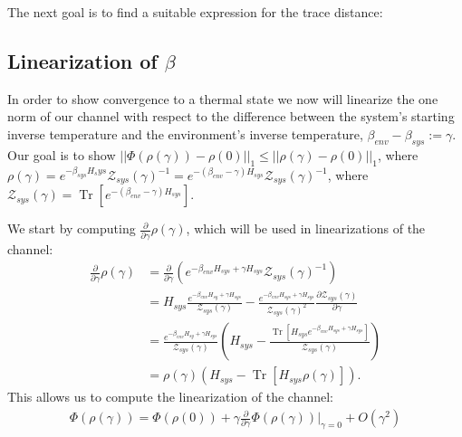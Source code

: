 \documentclass{article}
\newcommand{\parens}[1]{\left( #1 \right)}
\newcommand{\brackets}[1]{\left[ #1 \right]}
\newcommand{\norm}[1]{\left| \left| #1 \right| \right|}
\newcommand{\bigo}[1]{O\left( #1 \right)}
\DeclareMathOperator{\Tr}{Tr}
\newcommand{\trace}[1]{\Tr \brackets{ #1 }}
\newcommand{\partrace}[2]{\Tr_{#1} \brackets{ #2 }}
\newcommand{\partfun}{\mathcal{Z}}
\begin{document}
The next goal is to find a suitable expression for the trace distance:



\subsection{Linearization of $\beta$}
In order to show convergence to a thermal state we now will linearize the one norm of our channel with respect to the difference between the system's starting inverse temperature and the environment's inverse temperature, $\beta_{env} - \beta_{sys} := \gamma$. Our goal is to show $\norm{\Phi(\rho(\gamma)) - \rho(0)}_1 \leq \norm{\rho(\gamma) - \rho(0)}_1$, where $\rho(\gamma) = e^{- \beta_{sys} H_sys} \partfun_{sys}(\gamma)^{-1} = e^{-(\beta_{env} - \gamma) H_{sys}} \partfun_{sys}(\gamma)^{-1}$, where $\partfun_{sys}(\gamma) = \trace{e^{-(\beta_{env} - \gamma) H_{sys}}}$.

We start by computing $\frac{\partial}{\partial \gamma}\rho(\gamma)$, which will be used in linearizations of the channel:
\begin{align}
    \frac{\partial}{\partial \gamma} \rho(\gamma) &= \frac{\partial}{\partial \gamma} \parens{e^{-\beta_{env} H_{sys} + \gamma H_{sys}} \partfun_{sys}(\gamma)^{-1}} \\
    &= H_{sys} \frac{e^{-\beta_{env} H_{sy} + \gamma H_{sys}}}{\partfun_{sys}(\gamma)} - \frac{e^{-\beta_{env} H_{sys} + \gamma H_{sys}}}{\partfun_{sys}(\gamma)^2} \frac{\partial \partfun_{sys}(\gamma)}{\partial \gamma} \\
    &= \frac{e^{-\beta_{env} H_{sy} + \gamma H_{sys}}}{\partfun_{sys}(\gamma)} \parens{H_{sys} - \frac{\trace{H_{sys} e^{-\beta_{env} H_{sys} + \gamma H_{sys}}} }{\partfun_{sys}(\gamma)}} \\
    &= \rho(\gamma) \parens{H_{sys} - \trace{H_{sys} \rho(\gamma)}}.
\end{align}
This allows us to compute the linearization of the channel:
\begin{align}
    \Phi(\rho(\gamma)) = \Phi(\rho(0)) + \gamma \frac{\partial}{\partial \gamma} \Phi(\rho(\gamma))\bigg|_{\gamma = 0} + \bigo{\gamma^2}
\end{align}
\end{document}
